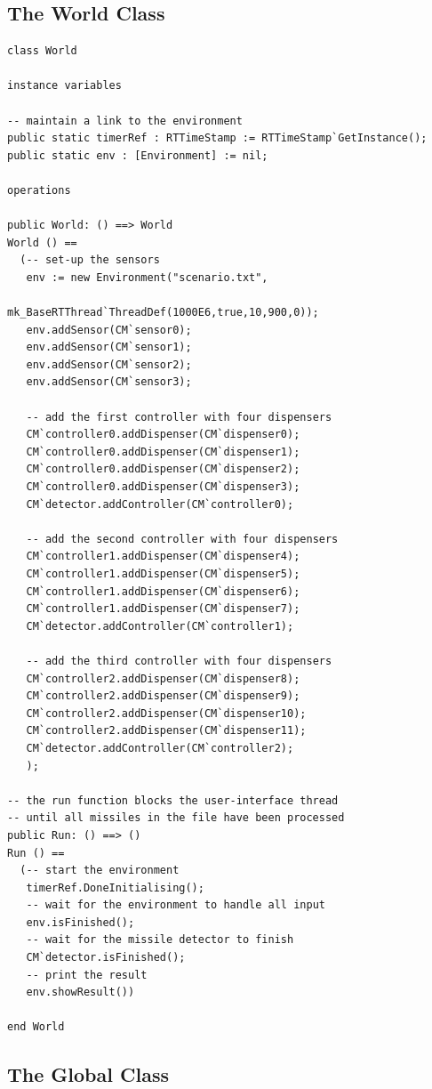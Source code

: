 \documentclass{overturerepchap}
\begin{document}
\subsection{The World Class}

\begin{lstlisting}
class World

instance variables

-- maintain a link to the environment
public static timerRef : RTTimeStamp := RTTimeStamp`GetInstance();
public static env : [Environment] := nil;

operations

public World: () ==> World
World () ==
  (-- set-up the sensors
   env := new Environment("scenario.txt", 
                          mk_BaseRTThread`ThreadDef(1000E6,true,10,900,0));
   env.addSensor(CM`sensor0);
   env.addSensor(CM`sensor1);
   env.addSensor(CM`sensor2);
   env.addSensor(CM`sensor3);

   -- add the first controller with four dispensers
   CM`controller0.addDispenser(CM`dispenser0);
   CM`controller0.addDispenser(CM`dispenser1);
   CM`controller0.addDispenser(CM`dispenser2);
   CM`controller0.addDispenser(CM`dispenser3);
   CM`detector.addController(CM`controller0);

   -- add the second controller with four dispensers
   CM`controller1.addDispenser(CM`dispenser4);
   CM`controller1.addDispenser(CM`dispenser5);
   CM`controller1.addDispenser(CM`dispenser6);
   CM`controller1.addDispenser(CM`dispenser7);
   CM`detector.addController(CM`controller1);
 
   -- add the third controller with four dispensers
   CM`controller2.addDispenser(CM`dispenser8);
   CM`controller2.addDispenser(CM`dispenser9);
   CM`controller2.addDispenser(CM`dispenser10);
   CM`controller2.addDispenser(CM`dispenser11);
   CM`detector.addController(CM`controller2);
   );

-- the run function blocks the user-interface thread
-- until all missiles in the file have been processed
public Run: () ==> ()
Run () == 
  (-- start the environment 
   timerRef.DoneInitialising();
   -- wait for the environment to handle all input
   env.isFinished();
   -- wait for the missile detector to finish
   CM`detector.isFinished();
   -- print the result
   env.showResult())

end World
\end{lstlisting}

\subsection{The Global Class}
\end{document}
